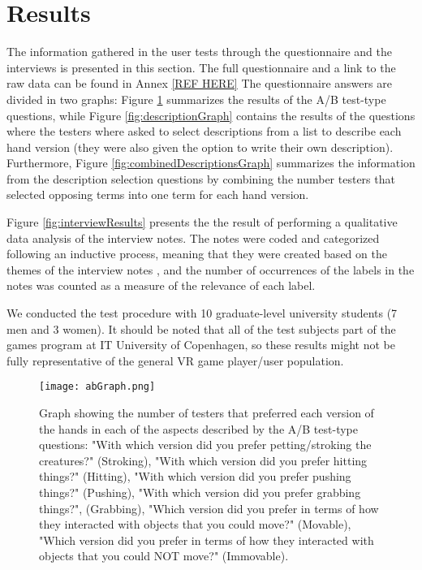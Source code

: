 \section{Results}
\label{sec:results}

The information gathered in the user tests through the questionnaire and the interviews is presented in this section. The full questionnaire and a link to the raw data can be found in Annex \ref{REF HERE} The questionnaire answers are divided in two graphs: Figure \ref{fig:abGraph} summarizes the results of the A/B test-type questions, while Figure \ref{fig:descriptionGraph} contains the results of the questions where the testers where asked to select descriptions from a list to describe each hand version (they were also given the option to write their own description). Furthermore, Figure \ref{fig:combinedDescriptionsGraph} summarizes the information from the description selection questions by combining the number testers that selected opposing terms into one term for each hand version.


Figure \ref{fig:interviewResults} presents the the result of performing a qualitative data analysis of the interview notes. The notes were coded and categorized following an inductive process, meaning that they were created based on the themes of the interview notes \parencite{Burnard2008}, and the number of occurrences of the labels in the notes was counted as a measure of the relevance of each label.

We conducted the test procedure with 10 graduate-level university students (7 men and 3 women). It should be noted that all of the test subjects part of the games program at IT University of Copenhagen, so these results might not be fully representative of the general VR game player/user population.

\begin{figure}[h]
\centering
\texttt{[image: abGraph.png]}
\caption{Graph showing the number of testers that preferred each version of the hands in each of the aspects described by the A/B test-type questions: "With which version did you prefer petting/stroking the creatures?" (Stroking), "With which version did you prefer hitting things?" (Hitting), "With which version did you prefer pushing things?" (Pushing), "With which version did you prefer grabbing things?", (Grabbing), "Which version did you prefer in terms of how they interacted with objects that you could move?" (Movable), "Which version did you prefer in terms of how they interacted with objects that you could NOT move?" (Immovable).}
\label{fig:abGraph}
\end{figure}

